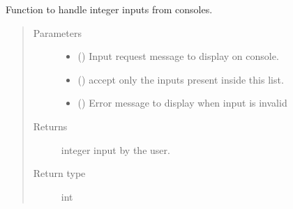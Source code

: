 \documentclass[letterpaper,10pt,english]{sphinxmanual}
\begin{document}

\begin{fulllineitems}
\label{\detokenize{docs/source/common:common.input_handler.get_input_int}}
Function to handle integer inputs from consoles.
\begin{quote}\begin{description}
\item[{Parameters}] \leavevmode\begin{itemize}
\item {} 
 () \textendash{} Input request message to display on console.

\item {} 
 () \textendash{} accept only the inputs present inside this list.

\item {} 
 () \textendash{} Error message to display when input is invalid

\end{itemize}

\item[{Returns}] \leavevmode
integer input by the user.

\item[{Return type}] \leavevmode
int

\end{description}\end{quote}

\end{fulllineitems}

\end{document}

